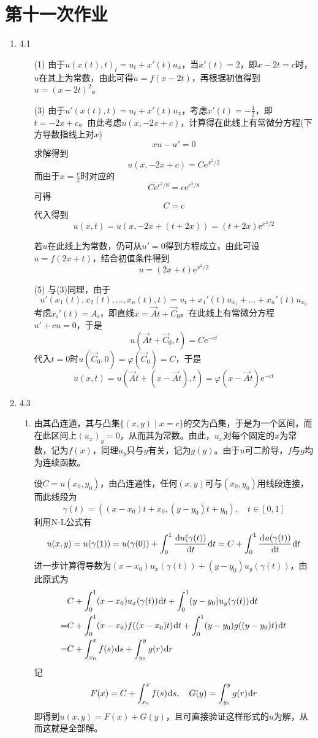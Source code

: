 \documentclass[a4paper,UTF8,fontset=windows,10pt]{ctexart}
\newcommand*{\dr}{\hspace{0.07em}\mathrm{d}}
\newcommand*{\er}{\mathrm{e}}
\begin{document}
\section{第十一次作业}
\begin{enumerate}
    \item 4.1
    \begin{enumerate}
        \item[(1)] 由于$u(x(t),t)_t=u_t+x'(t)u_x$，当$x'(t)=2$，即$x-2t=c$时，$u$在其上为常数，由此可得$u=f(x-2t)$，再根据初值得到$u=(x-2t)^2$。
        \item[(3)] 由于$u'(x(t),t)=u_t+x'(t)u_x$，考虑$x'(t)=-\frac{1}{2}$，即$t=-2x+c$。由此考虑$u(x,-2x+c)$，计算得在此线上有常微分方程(下方导数指线上对$x$)
        $$xu-u'=0$$
        求解得到
        $$u(x,-2x+c)=C\er^{x^2/2}$$
        而由于$x=\frac{c}{2}$时对应的
        $$C\er^{c^2/8}=c\er^{c^2/8}$$
        可得
        $$C=c$$
        代入得到
        $$u(x,t)=u(x,-2x+(t+2x))=(t+2x)\er^{x^2/2}$$
        
        
        若$u$在此线上为常数，仍可从$u'=0$得到方程成立，由此可设$u=f(2x+t)$，结合初值条件得到
        $$u=(2x+t)\er^{x^2/2}$$
        
        \item[(5)] 与(3)同理，由于
        $$u'(x_1(t),x_2(t),\dots,x_n(t),t)=u_t+x_1'(t)u_{x_1}+\dots+x_n'(t)u_{x_n}$$
        考虑$x_i'(t)=A_i$，即直线$x=\vec{A}t+\vec{C}_0$。在此线上有常微分方程$u'+cu=0$，于是
        $$u(\vec{A}t+\vec{C}_0,t)=C\er^{-ct}$$
        代入$t=0$时$u(\vec{C}_0,0)=\varphi(\vec{C}_0)=C$，于是
        $$u(x,t)=u(\vec{A}t+(x-\vec{A}t),t)=\varphi(x-\vec{A}t)\er^{-ct}$$
    \end{enumerate}
    
    \item 4.3
    \begin{enumerate}[(1)]
        \item 由其凸连通，其与凸集$\{(x,y)\mid x=c\}$的交为凸集，于是为一个区间，而在此区间上$(u_x)_y=0$，从而其为常数。由此，$u_x$对每个固定的$x$为常数，记为$f(x)$，同理$u_y$只与$y$有关，记为$g(y)$。由于$u$可二阶导，$f$与$g$均为连续函数。
        
        设$C=u(x_0,y_0)$，由凸连通性，任何$(x,y)$可与$(x_0,y_0)$用线段连接，而此线段为
        $$\gamma(t)=((x-x_0)t+x_0,(y-y_0)t+y_0),\quad t\in[0,1]$$
        利用N-L公式有
        $$u(x,y)=u(\gamma(1))=u(\gamma(0))+\int_0^1\frac{\dr u(\gamma(t))}{\dr t}\dr t=C+\int_0^1\frac{\dr u(\gamma(t))}{\dr t}\dr t$$
        进一步计算得导数为$(x-x_0)u_x(\gamma(t))+(y-y_0)u_y(\gamma(t))$，由此原式为
        $$\begin{aligned}
        &C+\int_0^1(x-x_0)u_x(\gamma(t))\dr t+\int_0^1(y-y_0)u_y(\gamma(t))\dr t\\=&C+\int_0^1(x-x_0)f((x-x_0)t)\dr t+\int_0^1(y-y_0)g((y-y_0)t)\dr t\\=&C+\int_{x_0}^xf(s)\dr s+\int_{y_0}^yg(r)\dr r\end{aligned}$$
        记
        $$F(x)=C+\int_{x_0}^xf(s)\dr s,\quad G(y)=\int_{y_0}^yg(r)\dr r$$
        即得到$u(x,y)=F(x)+G(y)$，且可直接验证这样形式的$u$为解，从而这就是全部解。
    

\end{enumerate}
\end{enumerate}
\end{document}
